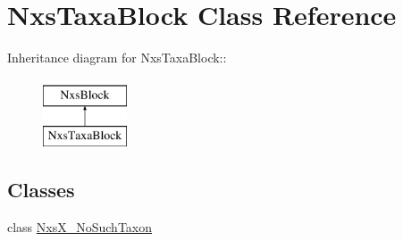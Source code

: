 \hypertarget{classNxsTaxaBlock}{
\section{NxsTaxaBlock Class Reference}
\label{classNxsTaxaBlock}
}
Inheritance diagram for NxsTaxaBlock::\begin{figure}[H]
\begin{center}
\leavevmode
\includegraphics[height=2cm]{classNxsTaxaBlock}
\end{center}
\end{figure}
\subsection*{Classes}
\begin{DoxyCompactItemize}
\item 
class \hyperlink{classNxsTaxaBlock_1_1NxsX__NoSuchTaxon}{NxsX\_\-NoSuchTaxon}
\end{DoxyCompactItemize}
